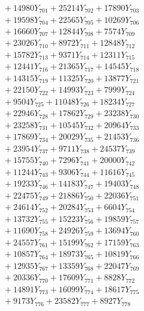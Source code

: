 \documentclass[a4paper,10pt]{article}
\begin{document}
{\begin{align}
&\;  + 14980 Y_{701} + 25214 Y_{702} + 17890 Y_{703} \\[0.3ex]
&\;  + 19598 Y_{704} + 22565 Y_{705} + 10269 Y_{706} \\[0.3ex]
&\;  + 16660 Y_{707} + 12844 Y_{708} + 7574 Y_{709} \\[0.3ex]
&\;  + 23026 Y_{710} + 8972 Y_{711} + 12848 Y_{712} \\[0.3ex]
&\;  + 15782 Y_{713} + 9371 Y_{714} + 12311 Y_{715} \\[0.3ex]
&\;  + 12441 Y_{716} + 21365 Y_{717} + 14545 Y_{718} \\[0.5ex]\allowbreak
&\;  + 14315 Y_{719} + 11325 Y_{720} + 13877 Y_{721} \\[0.3ex]
&\;  + 22150 Y_{722} + 14993 Y_{723} + 7999 Y_{724} \\[0.3ex]
&\;  + 9504 Y_{725} + 11048 Y_{726} + 18234 Y_{727} \\[0.3ex]
&\;  + 22946 Y_{728} + 17862 Y_{729} + 23238 Y_{730} \\[0.3ex]
&\;  + 23258 Y_{731} + 10545 Y_{732} + 20964 Y_{733} \\[0.3ex]
&\;  + 17869 Y_{734} + 20029 Y_{735} + 21453 Y_{736} \\[0.3ex]
&\;  + 23954 Y_{737} + 9711 Y_{738} + 24537 Y_{739} \\[0.3ex]
&\;  + 15755 Y_{740} + 7296 Y_{741} + 20000 Y_{742} \\[0.3ex]
&\;  + 11244 Y_{743} + 9306 Y_{744} + 11616 Y_{745} \\[0.3ex]
&\;  + 19233 Y_{746} + 14183 Y_{747} + 19403 Y_{748} \\[0.5ex]\allowbreak
&\;  + 22475 Y_{749} + 21886 Y_{750} + 22036 Y_{751} \\[0.3ex]
&\;  + 24614 Y_{752} + 20284 Y_{753} + 6604 Y_{754} \\[0.3ex]
&\;  + 13732 Y_{755} + 15223 Y_{756} + 19859 Y_{757} \\[0.3ex]
&\;  + 11690 Y_{758} + 24926 Y_{759} + 13694 Y_{760} \\[0.3ex]
&\;  + 24557 Y_{761} + 15199 Y_{762} + 17159 Y_{763} \\[0.3ex]
&\;  + 10857 Y_{764} + 18973 Y_{765} + 10819 Y_{766} \\[0.3ex]
&\;  + 12935 Y_{767} + 13359 Y_{768} + 22047 Y_{769} \\[0.3ex]
&\;  + 20336 Y_{770} + 17609 Y_{771} + 8828 Y_{772} \\[0.3ex]
&\;  + 14891 Y_{773} + 16099 Y_{774} + 18617 Y_{775} \\[0.3ex]
&\;  + 9173 Y_{776} + 23582 Y_{777} + 8927 Y_{778} \\[0.5ex]\allowbreak

\end{align}}
\end{document}
